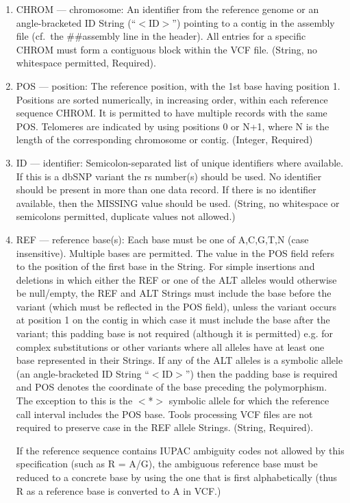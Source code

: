 \documentclass[8pt]{article}
\begin{document}
\begin{enumerate}
  \item CHROM --- chromosome: An identifier from the reference genome or an angle-bracketed ID String (``$<$ID$>$'') pointing to a contig in the assembly file (cf.\ the \#\#assembly line in the header).
  All entries for a specific CHROM must form a contiguous block within the VCF file.
  (String, no whitespace permitted, Required).
  \item POS --- position: The reference position, with the 1st base having position 1.
  Positions are sorted numerically, in increasing order, within each reference sequence CHROM.
  It is permitted to have multiple records with the same POS.
  Telomeres are indicated by using positions 0 or N+1, where N is the length of the corresponding chromosome or contig.
  (Integer, Required)
  \item ID --- identifier: Semicolon-separated list of unique identifiers where available.
  If this is a dbSNP variant the rs number(s) should be used.
  No identifier should be present in more than one data record.
  If there is no identifier available, then the MISSING value should be used.
  (String, no whitespace or semicolons permitted, duplicate values not allowed.)
  \item REF --- reference base(s): Each base must be one of A,C,G,T,N (case insensitive).
  Multiple bases are permitted.
  The value in the POS field refers to the position of the first base in the String.
  For simple insertions and deletions in which either the REF or one of the ALT alleles would otherwise be null/empty, the REF and ALT Strings must include the base before the variant (which must be reflected in the POS field), unless the variant occurs at position 1 on the contig in which case it must include the base after the variant; this padding base is not required (although it is permitted) e.g. for complex substitutions or other variants where all alleles have at least one base represented in their Strings.
  If any of the ALT alleles is a symbolic allele (an angle-bracketed ID String ``$<$ID$>$'') then the padding base is required and POS denotes the coordinate of the base preceding the polymorphism.
  The exception to this is the $<$*$>$ symbolic allele for which the reference call interval includes the POS base.
  Tools processing VCF files are not required to preserve case in the REF allele Strings. (String, Required).

  If the reference sequence contains IUPAC ambiguity codes not allowed by this specification (such as R = A/G), the ambiguous reference base must be reduced to a concrete base by using the one that is first alphabetically (thus R as a reference base is converted to A in VCF.)


\end{enumerate}
\end{document}
